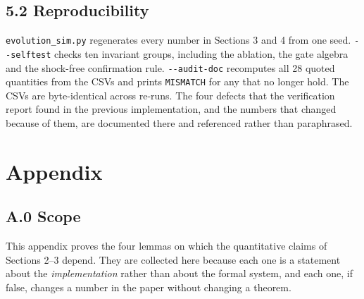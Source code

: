 \documentclass[11pt,a4paper]{article}
\begin{document}
\subsection{5.2 Reproducibility}\label{reproducibility}

\texttt{evolution\_sim.py} regenerates every number in Sections 3 and 4 from one seed.
\texttt{-\/-selftest} checks ten invariant groups, including the ablation, the gate
algebra and the shock-free confirmation rule. \texttt{-\/-audit-doc} recomputes all 28
quoted quantities from the CSVs and prints \texttt{MISMATCH} for any that no longer hold.
The CSVs are byte-identical across re-runs. The four defects that the verification
report found in the previous implementation, and the numbers that changed because
of them, are documented there and referenced rather than paraphrased.


\section{Appendix}\label{appendix}

\subsection{A.0 Scope}\label{a.0-scope}

This appendix proves the four lemmas on which the quantitative claims of
Sections 2--3 depend. They are collected here because each one is a statement
about the \emph{implementation} rather than about the formal system, and each one, if
false, changes a number in the paper without changing a theorem.
\end{document}
